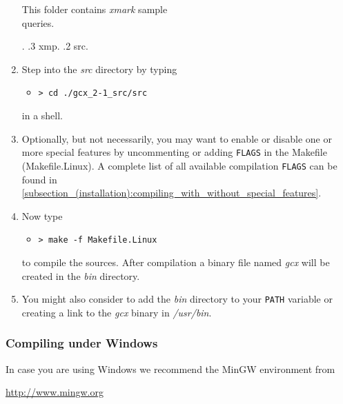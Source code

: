 \begin{enumerate}
{{{\begin{minipage}[t]{8cm}
         This folder contains \emph{xmark} sample \\ queries. \\
       \end{minipage}}.
  .3 xmp.
  .2 src.
}}
  \item Step into the \emph{src} directory by typing
        \begin{itemize}
          \setlength{\itemsep}{0pt}
          \item[] \texttt{> cd ./gcx\_2-1\_src/src}
        \end{itemize}
        \noindent in a shell.
  \item Optionally, but not necessarily, you may want to enable or disable one or more special features by uncommenting or adding \texttt{FLAGS} in the Makefile (Makefile.Linux). A complete list of all available compilation \texttt{FLAGS} can be found in \autoref{subsection_(installation):compiling_with_without_special_features}.
      \clearpage
  \item Now type
        \begin{itemize}
          \setlength{\itemsep}{0pt}
          \item[] \texttt{> make -f Makefile.Linux}
        \end{itemize}
        \noindent to compile the sources. After compilation a binary file named \emph{gcx} will be created in the \emph{bin} directory.
  \item You might also consider to add the \emph{bin} directory to your \texttt{PATH} variable or creating a link to the \emph{gcx} binary in \emph{/usr/bin}.
\end{enumerate}

\subsubsection{Compiling under Windows}
In case you are using Windows we recommend the MinGW environment from
\begin{center}
\href{http://www.mingw.org}{http://www.mingw.org}
\end{center}

